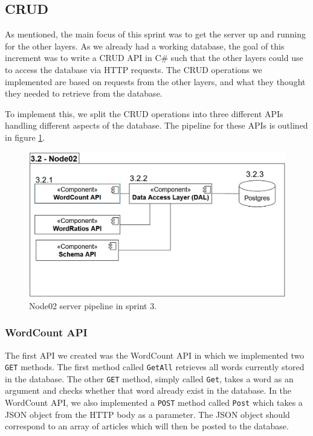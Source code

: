 \subsection{CRUD}

As mentioned, the main focus of this sprint was to get the server up and running for the other layers. 
As we already had a working database, the goal of this increment was to write a CRUD API in C\# such that the other layers could use to access the database via HTTP requests.
The CRUD operations we implemented are based on requests from the other layers, and what they thought they needed to retrieve from the database.

To implement this, we split the CRUD operations into three different APIs handling different aspects of the database. 
The pipeline for these APIs is outlined in figure \ref{Node02Sprint3}.

\begin{figure}[h]
    \centering
    \includegraphics[width=\linewidth]{Images/Node02Sprint3.PNG}
    \caption{Node02 server pipeline in sprint 3.}
    \label{Node02Sprint3}
\end{figure}

\subsubsection{WordCount API}
The first API we created was the WordCount API in which we implemented two \texttt{GET} methods.
The first method called \texttt{GetAll} retrieves all words currently stored in the database.
The other \texttt{GET} method, simply called \texttt{Get}, takes a word as an argument and checks whether that word already exist in the database.
In the WordCount API, we also implemented a \texttt{POST} method called \texttt{Post} which takes a JSON object from the HTTP body as a parameter. 
The JSON object should correspond to an array of articles which will then be posted to the database. 

